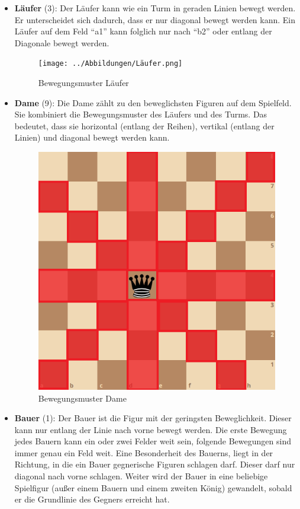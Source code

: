 \documentclass[12pt]{article}
\begin{document}
\begin{itemize}
	\item 
		\textbf{Läufer} (3): Der
		Läufer kann wie ein Turm in geraden Linien bewegt werden. Er
		unterscheidet sich dadurch, dass er nur diagonal bewegt werden kann. Ein
		Läufer auf dem Feld ``a1'' kann folglich nur nach ``b2'' oder entlang
		der Diagonale bewegt werden. 
		
		\begin{figure}
			\centering
			\texttt{[image: ../Abbildungen/Läufer.png]} 
			\caption{Bewegungsmuster Läufer}
		\end{figure}
	
	\item 
		\textbf{Dame} (9): Die Dame zählt zu den beweglichsten Figuren auf dem
		Spielfeld. Sie kombiniert die Bewegungsmuster des Läufers und des Turms.
		Das bedeutet, dass sie horizontal (entlang der Reihen), vertikal
		(entlang der Linien) und diagonal bewegt werden kann.
		
		\begin{figure}
			\centering
			\includegraphics{../Abbildungen/Dame.png} 
			\caption{Bewegungsmuster Dame}
		\end{figure}
	
	\item
		\textbf{Bauer} (1): Der
		Bauer ist die Figur mit der geringsten Beweglichkeit. Dieser kann nur
		entlang der Linie nach vorne bewegt werden. Die erste Bewegung jedes
		Bauern kann ein oder zwei Felder weit sein, folgende Bewegungen sind
		immer genau ein Feld weit. Eine Besonderheit des Bauerns, liegt in der
		Richtung, in die ein Bauer gegnerische Figuren schlagen darf. Dieser
		darf nur diagonal nach vorne schlagen. Weiter wird der Bauer in eine
		beliebige Spielfigur (außer einem Bauern und einem zweiten König)
		gewandelt, sobald er die Grundlinie des Gegners erreicht hat.
		

\end{itemize}
\end{document}
